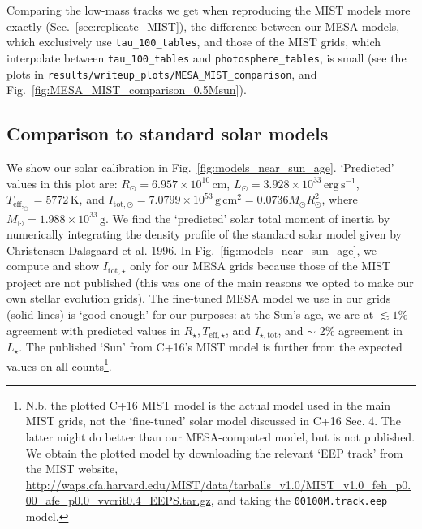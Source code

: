 \documentclass{article}
\begin{document}
Comparing the low-mass tracks we get when reproducing the MIST models more
exactly (Sec.~\ref{sec:replicate_MIST}), the difference between our MESA
models, which exclusively use \texttt{tau\_100\_tables}, and those of the MIST
grids, which interpolate between \texttt{tau\_100\_tables} and
\texttt{photosphere\_tables}, is small (see the plots in
\texttt{results/writeup\_plots/MESA\_MIST\_comparison}, and 
Fig.~\ref{fig:MESA_MIST_comparison_0.5Msun}).


\subsection{Comparison to standard solar models}
\label{sec:solar_calibration}
We show our solar calibration in Fig.~\ref{fig:models_near_sun_age}.
`Predicted' values in this plot are: $R_\odot = 
6.957\times10^{10}\,\mathrm{cm}$, $L_\odot = 
3.928\times10^{33}\,\mathrm{erg\,s^{-1}}$, $T_\mathrm{eff,_\odot} = 
5772\,\mathrm{K}$, and $I_\mathrm{tot,\odot} = 
7.0799\times10^{53}\,\mathrm{g\,cm^2} = 
0.0736 M_\odot R_\odot^2$, where $M_\odot = 1.988\times10^{33}\,\mathrm{g}$.
We find the `predicted' solar total moment of inertia by numerically 
integrating the density profile of the standard solar model given by 
Christensen-Dalsgaard et al. 1996.
In Fig.~\ref{fig:models_near_sun_age}, we compute and show 
$I_\mathrm{tot,\star}$ only for our MESA grids because those of the MIST 
project are not published (this was one of the main reasons we opted to make 
our own stellar evolution grids).
The fine-tuned MESA model we use in our grids (solid lines) is `good enough' 
for our purposes: at the Sun's age, we are at $\lesssim 1\%$ agreement with 
predicted values in $R_\star, T_\mathrm{eff,\star}$, and 
$I_\mathrm{\star,tot}$, and $\sim$ 2\% agreement in $L_\star$.
The published `Sun' from C+16's MIST model is further from the expected values 
on all counts\footnote{N.b. the plotted C+16 MIST model is the actual model 
used in the main MIST grids, not the `fine-tuned' solar model discussed in C+16 
Sec. 4. The latter might do better than our MESA-computed model, but is not 
published. We obtain the plotted model by downloading the relevant `EEP track' 
from the 
MIST website, 
\url{http://waps.cfa.harvard.edu/MIST/data/tarballs_v1.0/MIST_v1.0_feh_p0.00_afe_p0.0_vvcrit0.4_EEPS.tar.gz},
and taking the \texttt{00100M.track.eep} model.}.
\end{document}

